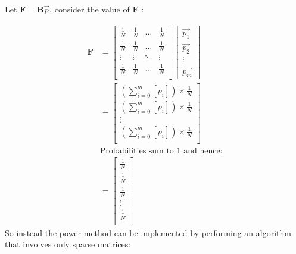 \documentclass[11pt]{report}
\begin{document}
Let \(\mathbf{F}= \mathbf{B}\vec{p}\), consider the value of \(\mathbf{F}\) :

\begin{align}
\mathbf{F} &=
\begin{bmatrix}
\frac{1}{N} & \frac{1}{N} & \ldots & \frac{1}{N} \\
\frac{1}{N} & \frac{1}{N} & \ldots & \frac{1}{N} \\
\vdots      & \vdots      & \ddots & \vdots \\
\frac{1}{N} & \frac{1}{N} & \ldots & \frac{1}{N} \\
\end{bmatrix} \label{eq:bgVal2}
\begin{bmatrix}
\vec{p_1} \\ \vec{p_2} \\ \vdots \\ \vec{p_m}
\end{bmatrix}  \\
&= \begin{bmatrix}
\left( \sum^{m}_{i= 0}   \left[ p_i \right]  \right) \times \frac{1}{N} \\
\left( \sum^{m}_{i= 0}   \left[ p_i \right]  \right) \times \frac{1}{N} \\
\vdots  \\
\left( \sum^{m}_{i= 0}   \left[ p_i \right]  \right) \times \frac{1}{N} \\
\end{bmatrix}  \\
& \text{Probabilities sum to 1 and hence:} \\
&= \begin{bmatrix}
\frac{1}{N} \\
\frac{1}{N} \\
\frac{1}{N} \\
\vdots  \\
\frac{1}{N} \\
\end{bmatrix}
\end{align}
So instead the power method can be implemented by performing an algorithm that involves only sparse matrices:
\end{document}
